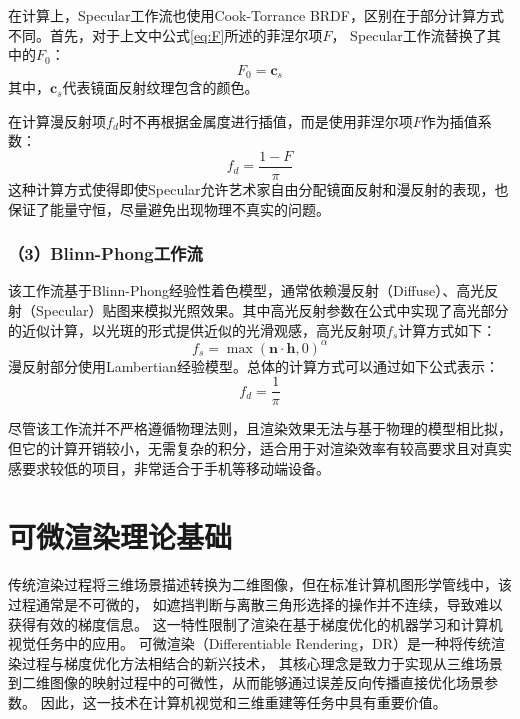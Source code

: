 在计算上，Specular工作流也使用Cook-Torrance BRDF，区别在于部分计算方式不同。首先，对于上文中公式\eqref{eq:F}所述的菲涅尔项$F$，
Specular工作流替换了其中的$F_0$：
\begin{equation}\label{eq:F0_spec}
F_0={\boldsymbol{c}}_s
\end{equation}
其中，${\boldsymbol{c}}_s$代表镜面反射纹理包含的颜色。

在计算漫反射项$f_d$时不再根据金属度进行插值，而是使用菲涅尔项$F$作为插值系数：
\begin{equation}\label{eq:diffuse_spec}
f_d=\frac{1-F}{\pi}
\end{equation}
  这种计算方式使得即使Specular允许艺术家自由分配镜面反射和漫反射的表现，也保证了能量守恒，尽量避免出现物理不真实的问题。

\subsubsection*{（3）Blinn-Phong工作流}

该工作流基于Blinn-Phong经验性着色模型，通常依赖漫反射（Diffuse）、高光反射（Specular）贴图来模拟光照效果。其中高光反射参数在公式中实现了高光部分的近似计算，以光斑的形式提供近似的光滑观感，高光反射项$f_s$计算方式如下：
\begin{equation}\label{eq:specular_BlinnPhong}
f_s=\max(\boldsymbol{n}\cdot \boldsymbol{h},0)^\alpha
\end{equation}
漫反射部分使用Lambertian经验模型。总体的计算方式可以通过如下公式表示：
\begin{equation}\label{eq:diffuse_BlinnPhong}
f_d=\frac{1}{\pi}
\end{equation}

尽管该工作流并不严格遵循物理法则，且渲染效果无法与基于物理的模型相比拟，但它的计算开销较小，无需复杂的积分，适合用于对渲染效率有较高要求且对真实感要求较低的项目，非常适合于手机等移动端设备。

\section{可微渲染理论基础}
传统渲染过程将三维场景描述转换为二维图像，但在标准计算机图形学管线中，该过程通常是不可微的，
如遮挡判断与离散三角形选择的操作并不连续，导致难以获得有效的梯度信息。
这一特性限制了渲染在基于梯度优化的机器学习和计算机视觉任务中的应用。
可微渲染（Differentiable Rendering，DR）是一种将传统渲染过程与梯度优化方法相结合的新兴技术，
其核心理念是致力于实现从三维场景到二维图像的映射过程中的可微性，从而能够通过误差反向传播直接优化场景参数。
因此，这一技术在计算机视觉和三维重建等任务中具有重要价值。


